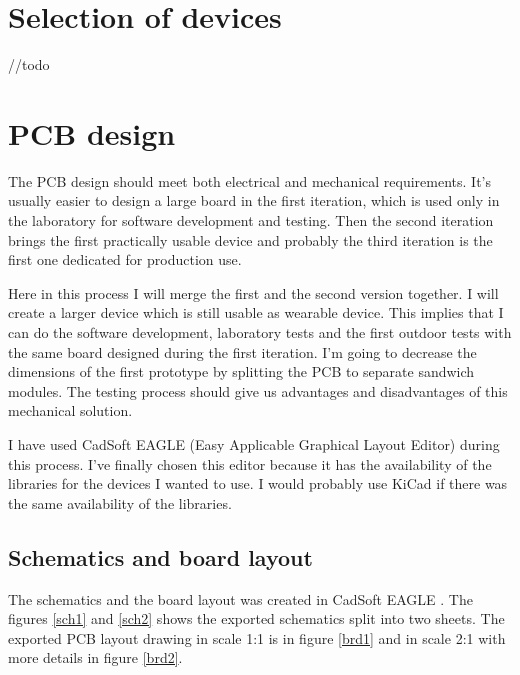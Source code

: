 \section{Selection of devices}
\label{HWdeviceSelection}
//todo

\section{PCB design}
\label{HWpcbDesign}
The PCB design should meet both electrical and mechanical requirements. It's usually easier to design a large board in the first iteration, which is used only in the laboratory for software development and testing. Then the second iteration brings the first practically usable device and probably the third iteration is the first one dedicated for production use.

Here in this process I will merge the first and the second version together. I will create a larger device which is still usable as wearable device. This implies that I can do the software development, laboratory tests and the first outdoor tests with the same board designed during the first iteration. I'm going to decrease the dimensions of the first prototype by splitting the PCB to separate sandwich modules. The testing process should give us advantages and disadvantages of this mechanical solution.

I have used CadSoft EAGLE (Easy Applicable Graphical Layout Editor) \cite{EAGLE} during this process. I've finally chosen this editor because it has the availability of the libraries for the devices I wanted to use. I would probably use KiCad \cite{KiCad} if there was the same availability of the libraries.

\subsection{Schematics and board layout}
The schematics and the board layout was created in CadSoft EAGLE \cite{EAGLE}. The figures \ref{sch1} and \ref{sch2} shows the exported schematics split into two sheets. The exported PCB layout drawing in scale 1:1 is in figure \ref{brd1} and in scale 2:1 with more details in figure \ref{brd2}.

